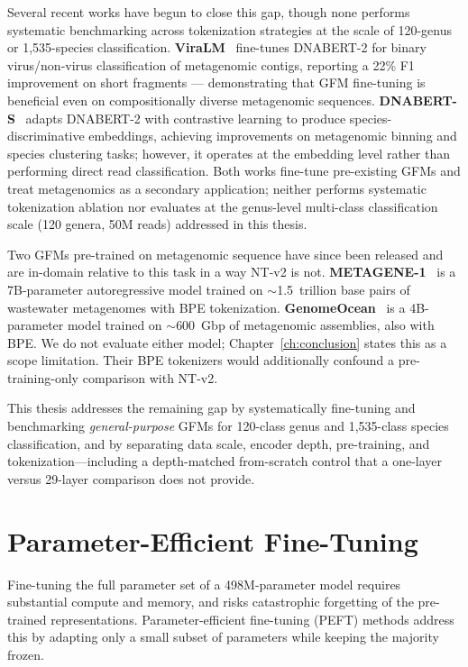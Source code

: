 Several recent works have begun to close this gap, though none performs systematic benchmarking across tokenization strategies at the scale of 120-genus or 1,535-species classification.
\textbf{ViraLM}~\cite{Peng2024viralm} fine-tunes DNABERT-2 for binary virus/non-virus classification of metagenomic contigs, reporting a 22\% F1 improvement on short fragments — demonstrating that GFM fine-tuning is beneficial even on compositionally diverse metagenomic sequences.
\textbf{DNABERT-S}~\cite{Zhou2025dnaberts} adapts DNABERT-2 with contrastive learning to produce species-discriminative embeddings, achieving improvements on metagenomic binning and species clustering tasks; however, it operates at the embedding level rather than performing direct read classification.
Both works fine-tune pre-existing GFMs and treat metagenomics as a secondary application; neither performs systematic tokenization ablation nor evaluates at the genus-level multi-class classification scale (120 genera, 50M reads) addressed in this thesis.

Two GFMs pre-trained on metagenomic sequence have since been released and are in-domain relative to this task in a way NT-v2 is not. \textbf{METAGENE-1}~\cite{Liu2025metagene} is a 7B-parameter autoregressive model trained on ${\sim}$1.5~trillion base pairs of wastewater metagenomes with BPE tokenization. \textbf{GenomeOcean}~\cite{Zhou2025genomeocean} is a 4B-parameter model trained on ${\sim}$600~Gbp of metagenomic assemblies, also with BPE. We do not evaluate either model; Chapter~\ref{ch:conclusion} states this as a scope limitation. Their BPE tokenizers would additionally confound a pre-training-only comparison with NT-v2.

This thesis addresses the remaining gap by systematically fine-tuning and benchmarking \emph{general-purpose} GFMs for 120-class genus and 1,535-class species classification, and by separating data scale, encoder depth, pre-training, and tokenization---including a depth-matched from-scratch control that a one-layer versus 29-layer comparison does not provide.

\section{Parameter-Efficient Fine-Tuning}
\label{sec:bg-peft}

Fine-tuning the full parameter set of a 498M-parameter model requires substantial compute and memory, and risks catastrophic forgetting of the pre-trained representations. Parameter-efficient fine-tuning (PEFT) methods address this by adapting only a small subset of parameters while keeping the majority frozen.


